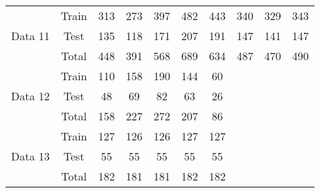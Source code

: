 \begin{table}[H]
{\begin{tabular}{cccccccccc}
\multirow{3}{*}{Data 11} & Train & 313   & 273   & 397   & 482   & 443   & 340  & 329  & 343  \\
                         & Test  & 135   & 118   & 171   & 207   & 191   & 147  & 141  & 147  \\
                         & Total & 448   & 391   & 568   & 689   & 634   & 487  & 470  & 490  \\ \hline
\multirow{3}{*}{Data 12} & Train & 110   & 158   & 190   & 144   & 60    &      &      &      \\
                         & Test  & 48    & 69    & 82    & 63    & 26    &      &      &      \\
                         & Total & 158   & 227   & 272   & 207   & 86    &      &      &      \\ \hline
\multirow{3}{*}{Data 13} & Train & 127   & 126   & 126   & 127   & 127   &      &      &      \\
                         & Test  & 55    & 55    & 55    & 55    & 55    &      &      &      \\
                         & Total & 182   & 181   & 181   & 182   & 182   &      &      &      \\ \hline
\end{tabular}
}\end{table}

\newpage

